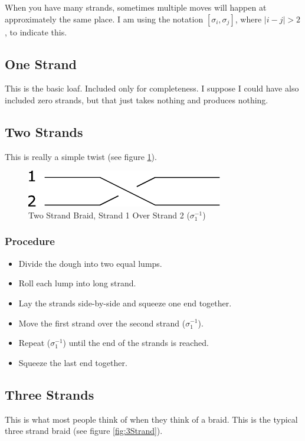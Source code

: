 \documentclass[10pt, openany]{book}
\begin{document}
When you have many strands, sometimes multiple moves will happen at approximately the same place.  I am using the notation $[\sigma_i, \sigma_j]$, where $\lvert i-j \rvert > 2$, to indicate this.

\subsection{One Strand}
This is the basic loaf.  Included only for completeness.  I suppose I could have also included zero strands, but that just takes nothing and produces nothing.

\subsection{Two Strands}
This is really a simple twist (see figure \ref{fig:2Strand}).

\begin{figure}[h]
  \center
  \includegraphics{Figures/2-strands.pdf}
  \caption{Two Strand Braid, Strand 1 Over Strand 2 ($\sigma^{-1}_1$)}
  \label{fig:2Strand}
\end{figure}

\subsubsection{Procedure}
\begin{itemize}
  \item Divide the dough into two equal lumps.
  \item Roll each lump into long strand.
  \item Lay the strands side-by-side and squeeze one end together.
  \item Move the first strand over the second strand ($\sigma^{-1}_1$).
  \item Repeat ($\sigma^{-1}_1$) until the end of the strands is reached.
  \item Squeeze the last end together.
\end{itemize}

\subsection{Three Strands}
This is what most people think of when they think of a braid.  This is the typical three strand braid (see figure \ref{fig:3Strand}).
\end{document}
